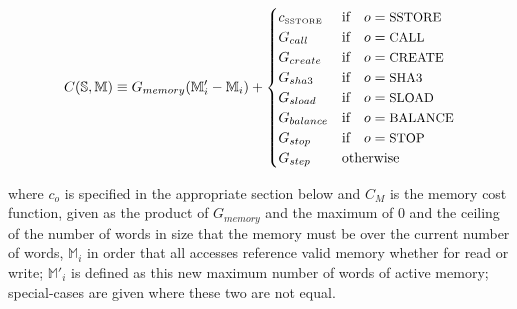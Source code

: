 \documentclass[9pt,oneside]{amsart}
\begin{document}
\begin{equation}
C(\mathbb{S}, \mathbb{M}) \equiv G_{memory}(\mathbb{M}'_i - \mathbb{M}_i) + \begin{cases}
c_\text{\tiny SSTORE} & \text{if} \quad o = \text{\small SSTORE} \\
G_{call} & \text{if} \quad o = \text{\small CALL}\\
G_{create} & \text{if} \quad o = \text{\small CREATE}\\
G_{sha3} & \text{if} \quad o = \text{\small SHA3}\\
G_{sload} & \text{if} \quad o = \text{\small SLOAD}\\
G_{balance} & \text{if} \quad o = \text{\small BALANCE}\\
G_{stop} & \text{if} \quad o = \text{\small STOP}\\
G_{step} & \text{otherwise}
\end{cases}
\end{equation}

where $c_o$ is specified in the appropriate section below and $C_M$ is the memory cost function, given as the product of $G_{memory}$ and the maximum of 0 and the ceiling of the number of words in size that the memory must be over the current number of words, $\mathbb{M}_i$ in order that all accesses reference valid memory whether for read or write; $\mathbb{M}'_i$ is defined as this new maximum number of words of active memory; special-cases are given where these two are not equal.
\end{document}
